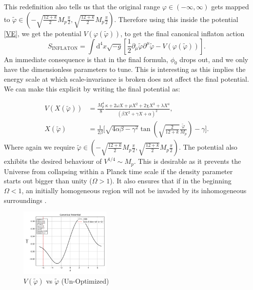 \documentclass[aps,prd,reprint,preprintnumbers,showpacs,floatfix,nofootinbib,superscript address]{revtex4-2}
\newcommand{\wb}[1]{{\color[RGB]{255,0,0}{\textbf{\textit{[WB: #1]}}}}}
\begin{document}
This redefinition also tells us that the original range $\varphi \in (-\infty,\infty)$ gets mapped to $\tilde{\varphi} \in \left( -\sqrt{\frac{12 + k}{2}}M_p \frac{\pi}{2},\sqrt{\frac{12 + k}{2}}M_p \frac{\pi}{2} \right)$. Therefore using this inside the potential \cref{VE}, we get the potential $V(\varphi(\tilde{\varphi}))$, to get the final canonical inflaton action
\begin{equation}
    S_{\text{INFLATON}} = \int \text{d}^4x \sqrt{-g} \left[ \frac{1}{2}\partial_\mu \tilde{\varphi}\partial^\mu \tilde{\varphi} - V(\varphi(\tilde{\varphi})) \right].
\end{equation}
An immediate consequence is that in the final formula, $\phi_0$ drops out, and we only have the dimensionless parameters to tune. This is interesting as this implies the energy scale at which scale-invariance is broken does not affect the final potential. We can make this explicit by writing the final potential as:

\begin{align}
    V(X(\tilde{\varphi})) &=  \frac{M_p^4}{8}  \frac{ \kappa + 2\omega X +\mu X^2 + 2\chi X^3 + \lambda X^4 }{(\beta X^2 + \gamma X + \alpha )^2} \label{Potential}, \\
    X(\tilde{\varphi}) &= \frac{1}{2\beta} \Biggl[ \sqrt{4\alpha\beta - \gamma^2} \tan\left(\sqrt{\frac{2}{12+k}}\frac{\tilde{\varphi}}{M_p}\right) - \gamma \Biggr]  \label{X}.
\end{align}
Where again we require $\tilde{\varphi} \in \left( -\sqrt{\frac{12 + k}{2}}M_p \frac{\pi}{2},\sqrt{\frac{12 + k}{2}}M_p \frac{\pi}{2} \right)$. The potential also exhibits the desired behaviour of $V^{1/4} \sim M_p$. This is desirable as it prevents the Universe from collapsing within a Planck time scale if the density parameter starts out bigger than unity ($\Omega > 1$). It also ensures that if in the beginning $\Omega < 1$, an initially homogeneous region will not be invaded by its inhomogeneous surroundings \cite{Liddle_Lyth_2000}.  
\begin{figure}[h!]
    \centering
    \includegraphics[width=0.4\textwidth]{../../Python/Figures/AE/inflation_plots/potential.png}
    \caption{$V(\tilde{\varphi})$ vs $\tilde{\varphi}$ (Un-Optimized)}
    \label{Canonical Potential vs Field1}
\end{figure}
\end{document}
